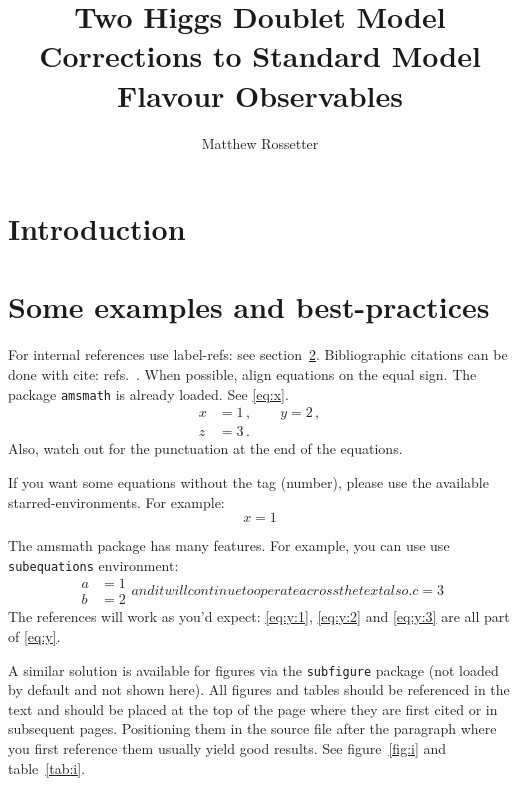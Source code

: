 \documentclass[a4paper,12pt]{article}
\title{Two Higgs Doublet Model Corrections to Standard Model Flavour Observables}
\author{Matthew Rossetter}
\affiliation{Supervised By Alexander Lenz}
\affiliation{MPhys Theoretical Physics, Durham University}
\begin{document}
 
\maketitle
\flushbottom

\section{Introduction}


\section{Some examples and best-practices}
\label{sec:examples}

For internal references use label-refs: see section~\ref{sec:examples}.
Bibliographic citations can be done with cite: refs.~\cite{a,b,c}.
When possible, align equations on the equal sign. The package
\texttt{amsmath} is already loaded. See \eqref{eq:x}.
\begin{equation}
\label{eq:x}
\begin{split}
x &= 1 \,,
\qquad
y = 2 \,,
\\
z &= 3 \,.
\end{split}
\end{equation}
Also, watch out for the punctuation at the end of the equations.


If you want some equations without the tag (number), please use the available
starred-environments. For example:
\begin{equation*}
x = 1
\end{equation*}

The amsmath package has many features. For example, you can use use\\
\texttt{subequations} environment:
\begin{subequations}\label{eq:y}
\begin{align}
\label{eq:y:1}
a & = 1
\\
\label{eq:y:2}
b & = 2
\end{align}
and it will continue to operate across the text also.
\begin{equation}
\label{eq:y:3}
c = 3
\end{equation}
\end{subequations}
The references will work as you'd expect: \eqref{eq:y:1},
\eqref{eq:y:2} and \eqref{eq:y:3} are all part of \eqref{eq:y}.

A similar solution is available for figures via the \texttt{subfigure}
package (not loaded by default and not shown here). 
All figures and tables should be referenced in the text and should be
placed at the top of the page where they are first cited or in
subsequent pages. Positioning them in the source file
after the paragraph where you first reference them usually yield good
results. See figure~\ref{fig:i} and table~\ref{tab:i}.
\end{document}
